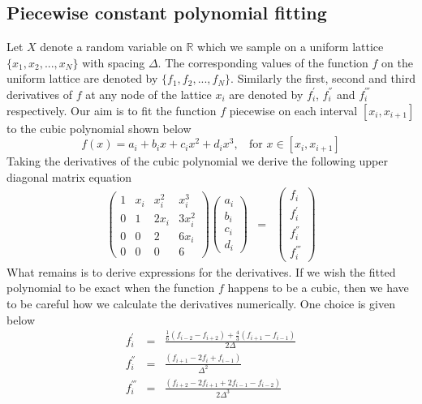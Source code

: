 \subsection{Piecewise constant polynomial fitting}
Let $X$ denote a random variable on $\mathbb R$ which we sample on a
uniform lattice $\{x_1, x_2, ...,x_N\}$ with spacing $\Delta$. The
corresponding values of the function $f$ on the uniform lattice are
denoted by $\{f_1, f_2, ...,f_N\}$. Similarly the first, second and
third derivatives of $f$ at any node of the lattice $x_i$ are denoted
by $f_i^{'}$, $f_i^{''}$ and $f_i^{'''}$ respectively. Our aim is to
fit the function $f$ piecewise on each interval $\left[x_i,
x_{i+1}\right]$ to the cubic polynomial shown below
\begin{equation}
f(x) = a_i+b_ix+c_ix^2+d_ix^3,~~~~\mbox{for } x \in \left[x_i, x_{i+1}\right] 
\end{equation} 
Taking the derivatives of the cubic polynomial we derive the following
upper diagonal matrix equation
\begin{eqnarray}
\left(\begin{array}{cccc}
1 & x_i & x_i^2 & x_i^3 \\
0 & 1 & 2 x_i & 3 x_i^2 \\
0 & 0 & 2 & 6 x_i \\
0 & 0 & 0 & 6
\end{array}\right) 
\left(\begin{array}{c}
a_i \\
b_i \\
c_i \\
d_i
\end{array}\right)  & = & 
\left(\begin{array}{c}
f_i \\
f_i^{'} \\
f_i^{''} \\
f_i^{'''}
\end{array}\right)
\end{eqnarray}
What remains is to derive expressions for the derivatives. If we wish
the fitted polynomial to be exact when the function $f$ happens to be
a cubic, then we have to be careful how we calculate the derivatives
numerically. One choice is given below
\begin{eqnarray}
f_i^{'} &=& \frac{\frac{1}{6} \left(f_{i-2}-f_{i+2}\right)+\frac{4}{3}\left(f_{i+1}-f_{i-1}\right)}{2 \Delta} \\
f_i^{''} &=& \frac{\left(f_{i+1}-2f_i+f_{i-1}\right)}{\Delta^2} \\
f_i^{'''} &=& \frac{\left(f_{i+2}-2f_{i+1}+2f_{i-1}-f_{i-2}\right)}{2 \Delta^3}
\end{eqnarray}
